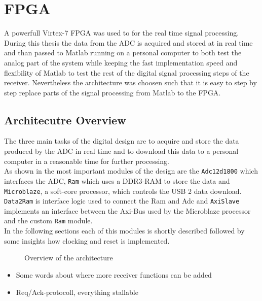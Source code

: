 \chapter{FPGA}
A powerfull Virtex-7 \gls{FPGA} was used to for the real time signal processing.
During this thesis the data from the \gls{ADC} is acquired and stored at in real
time and than passed to Matlab running on a personal computer to both test
the analog part of the system while keeping the fast implementation speed
and flexibility of Matlab to test the rest of the digital signal processing steps
of the receiver. Nevertheless the architecture was choosen such that it is easy
to step by step replace parts of the signal processing from Matlab to the
\gls{FPGA}.

\section{Architecutre Overview}
The three main tasks of the digital design are to acquire and store the data
produced by the \gls{ADC} in real time and to download this data to a
personal computer in a reasonable time for further processing. \\

As shown in  the most important
modules of the design are the \verb|Adc12d1800| which interfaces the
\gls{ADC}, \verb|Ram| which uses a DDR3-\gls{RAM} to store the data
and \verb|Microblaze|, a soft-core processor, which controls the
\gls{USB} 2 data download. \verb|Data2Ram| is interface logic used
to connect the \gls{Ram} and \gls{Adc} and \verb|AxiSlave| implements
an interface between the Axi-Bus used by the Microblaze processor
and the custom \verb|Ram| module. \\

In the following sections each of this modules is shortly described followed
by some insights how clocking and reset is implemented.

\begin{figure}[ht]
  \centering
  \caption{Overview of the architecture}
  \label{fig:fpga_architecture_overview}
\end{figure}

\begin{itemize}
\item Some words about where more receiver functions can be added
\item Req/Ack-protocoll, everything stallable
\end{itemize}

